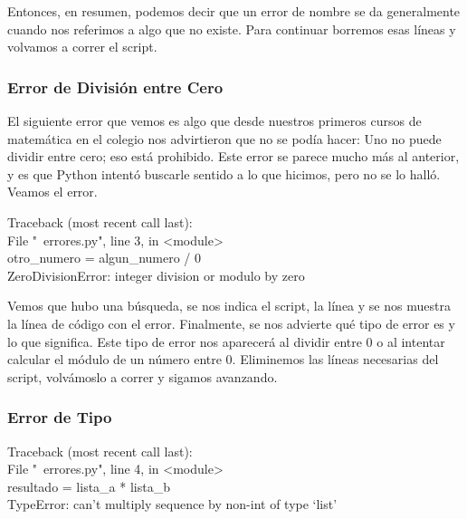 \documentclass[10pt,letterpaper]{article}
\newenvironment{Code}
{
\begin{lrbox}{\selvestebox}%
\begin{minipage}{\dimexpr\columnwidth-2\fboxsep\relax}
\fontfamily{\ttdefault}\selectfont
}
{\end{minipage}\end{lrbox}%
\begin{center}
\colorbox{light-gray}{\usebox{\selvestebox}}
\end{center}
}
\begin{document}
Entonces, en resumen, podemos decir que un error de nombre se da generalmente cuando nos referimos a algo que no existe. Para continuar borremos esas l\'ineas y volvamos a correr el script.

\subsubsection{Error de Divisi\'on entre Cero}
El siguiente error que vemos es algo que desde nuestros primeros cursos de matem\'atica en el colegio nos advirtieron que no se pod\'ia hacer: Uno no puede dividir entre cero; eso est\'a prohibido. Este error se parece mucho m\'as al anterior, y es que Python intent\'o buscarle sentido a lo que hicimos, pero no se lo hall\'o. Veamos el error.

\begin{Code}
{\color{red}Traceback (most recent call last):\\
\hspace*{4mm} File "\ \hspace{-2mm}errores.py", line 3, in <module>\\
\hspace*{8mm} otro\_numero = algun\_numero / 0\\
ZeroDivisionError: integer division or modulo by zero}
\end{Code}

Vemos que hubo una b\'usqueda, se nos indica el script, la l\'inea y se nos muestra la l\'inea de c\'odigo con el error. Finalmente, se nos advierte qu\'e tipo de error es y lo que significa. Este tipo de error nos aparecer\'a al dividir entre 0 o al intentar calcular el m\'odulo de un n\'umero entre 0. Eliminemos las l\'ineas necesarias del script, volv\'amoslo a correr y sigamos avanzando.

\subsubsection{Error de Tipo}

\begin{Code}
{\color{red}Traceback (most recent call last):\\
\hspace*{4mm} File "\ \hspace{-2mm}errores.py", line 4, in <module>\\
\hspace*{8mm} resultado = lista\_a * lista\_b\\
TypeError: can't multiply sequence by non-int of type `list'}
\end{Code}
\end{document}
